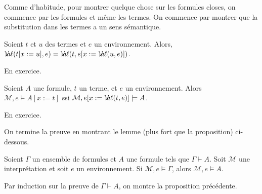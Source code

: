 \documentclass[./main]{subfiles}
\begin{document}
  \begin{prv}
    Comme d'habitude, pour montrer quelque chose sur les formules closes, on commence par les formules et même les termes.
    On commence par montrer que la substitution dans les termes a un sens sémantique.

    \begin{lem}
      Soient $t$ et $u$ des termes et $e$ un environnement.
      Alors,  $\mathcal{V}\hspace{-3.5pt}a\hspace{-0.5pt}\ell(t[x:=u], e) = \mathcal{V}\hspace{-3.5pt}a\hspace{-0.5pt}\ell(t, e[x := \mathcal{V}\hspace{-3.5pt}a\hspace{-0.5pt}\ell(u, e)])$.
    \end{lem}
    \begin{prv}
      En exercice.
    \end{prv}

    \begin{lem}
      Soient $A$ une formule, $t$ un terme, et $e$ un environnement.
      Alors  $\mathcal{M}, e \models A[x := t]$ ssi $\mathcal{M}, e[x := \mathcal{V}\hspace{-3.5pt}a\hspace{-0.5pt}\ell(t, e)] \models A$.
    \end{lem}
    \begin{prv}
      En exercice.
    \end{prv}

    On termine la preuve en montrant le lemme (plus fort que la proposition) ci-dessous.

    \begin{lem}
      Soient $\Gamma$ un ensemble de formules et $A$ une formule tels que $\Gamma \vdash A$.
      Soit $\mathcal{M}$ une interprétation et soit $e$ un environnement.
      Si $\mathcal{M}, e \models \Gamma$, alors  $\mathcal{M}, e \models A$.
    \end{lem}
    \begin{prv}
      Par induction sur la preuve de $\Gamma \vdash A$, on montre la proposition précédente.


\end{prv}
\end{prv}
\end{document}
